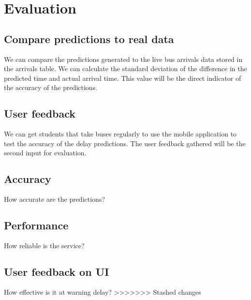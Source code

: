 \chapter{Evaluation}

\section{Compare predictions to real data}
We can compare the predictions generated to the live bus arrivals data stored in the arrivals table. We can calculate the standard deviation of the difference in the predicted time and actual arrival time. This value will be the direct indicator of the accuracy of the predictions.

\section{User feedback}
We can get students that take buses regularly to use the mobile application to test the accuracy of the delay predictions. The user feedback gathered will be the second input for evaluation.


\section{Accuracy}
How accurate are the predictions?


\section{Performance}
How reliable is the service?

\section{User feedback on UI}
How effective is it at warning delay?
>>>>>>> Stashed changes
